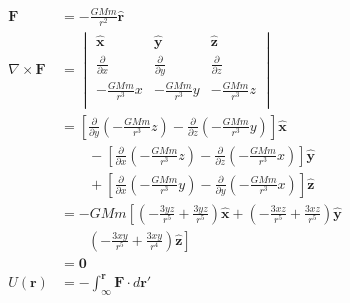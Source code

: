 \documentclass{article}
\renewcommand{\vec}[1]{\boldsymbol{\mathbf{#1}}}
\newcommand{\uvec}[1]{\hat{\vec{#1}}}
\begin{document}
\begin{align*}
  \vec{F}               & = -\frac{G M m}{r^2} \uvec{r}                                                                                                                                      \\
  \nabla \times \vec{F} & = \begin{vmatrix}
                              \uvec{x}                    & \uvec{y}                    & \uvec{z}                    \\
                              \frac{\partial}{\partial x} & \frac{\partial}{\partial y} & \frac{\partial}{\partial z} \\
                              -\frac{G M m}{r^3} x        & -\frac{G M m}{r^3} y        & -\frac{G M m}{r^3} z        \\
                            \end{vmatrix}                                                                          \\
                        & = \left[ \frac{\partial}{\partial y} \left( -\frac{G M m}{r^3} z \right) - \frac{\partial}{\partial z} \left( -\frac{G M m}{r^3} y \right) \right] \uvec{x}        \\
                        & \qquad - \left[ \frac{\partial}{\partial x} \left( -\frac{G M m}{r^3} z \right) - \frac{\partial}{\partial z} \left( -\frac{G M m}{r^3} x \right) \right] \uvec{y} \\
                        & \qquad + \left[ \frac{\partial}{\partial x} \left( -\frac{G M m}{r^3} y \right) - \frac{\partial}{\partial y} \left( -\frac{G M m}{r^3} x \right) \right] \uvec{z} \\
                        & = -G M m \left[ \left( -\frac{3 y z}{r^5} + \frac{3 y z}{r^5} \right) \uvec{x} + \left( -\frac{3 x z}{r^5} + \frac{3 x z}{r^5} \right) \uvec{y} \right.            \\
                        & \qquad \left. \left( -\frac{3 x y}{r^5} + \frac{3 x y}{r^4} \right) \uvec{z} \right]                                                                               \\
                        & = \vec{0}                                                                                                                                                          \\
  U(\vec{r})            & = -\int_{\vec{\infty}}^{\vec{r}} \vec{F} \cdot d \vec{r}'                                                                                                          \\

\end{align*}
\end{document}
